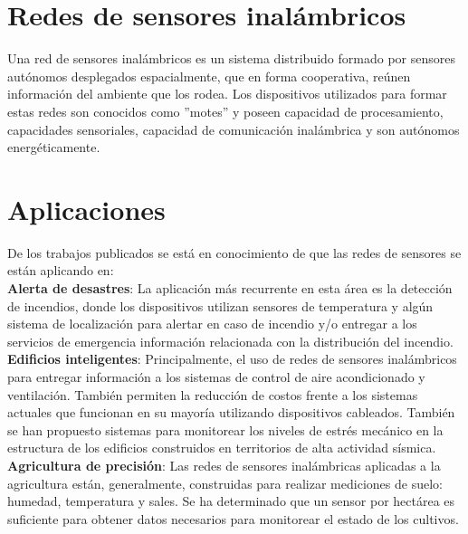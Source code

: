 \section{Redes de sensores inalámbricos}
Una red de sensores inalámbricos es un sistema distribuido formado por sensores autónomos desplegados espacialmente, que en forma cooperativa, reúnen información del ambiente que los rodea. Los dispositivos utilizados para formar estas redes son conocidos como ''motes'' y poseen capacidad de procesamiento, capacidades sensoriales, capacidad de comunicación inalámbrica y son autónomos energéticamente.

\section{Aplicaciones}
De los trabajos publicados se está en conocimiento de que las redes de sensores se están aplicando en\cite{WileyWSN}: \\

\textbf{Alerta de desastres}: La aplicación más recurrente en esta área es la detección de incendios, donde los dispositivos utilizan sensores de temperatura y algún sistema de localización para alertar en caso de incendio y/o entregar a los servicios de emergencia información relacionada con la distribución del incendio.\\

\textbf{Edificios inteligentes}: Principalmente, el uso de redes de sensores inalámbricos para entregar información a los sistemas de control de aire acondicionado y ventilación. También permiten la reducción de costos frente a los sistemas actuales que funcionan en su mayoría utilizando dispositivos cableados. También se han propuesto sistemas para monitorear los niveles de estrés mecánico en la estructura de los edificios construidos en territorios de alta actividad sísmica.\\

\textbf{Agricultura de precisión}: Las redes de sensores inalámbricas aplicadas a la agricultura están, generalmente, construidas para realizar mediciones de suelo: humedad, temperatura y sales. Se ha determinado que un sensor por hectárea es suficiente para obtener datos necesarios para monitorear el estado de los cultivos.\\

